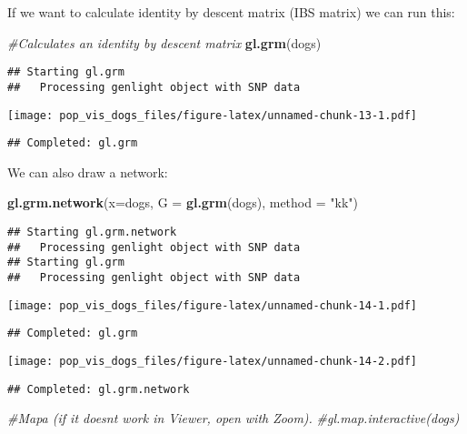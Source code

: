 \documentclass[
]{article}
\newenvironment{Shaded}{\begin{snugshade}}{\end{snugshade}}
\newcommand{\AttributeTok}[1]{\textcolor[rgb]{0.13,0.29,0.53}{#1}}
\newcommand{\CommentTok}[1]{\textcolor[rgb]{0.56,0.35,0.01}{\textit{#1}}}
\newcommand{\FunctionTok}[1]{\textcolor[rgb]{0.13,0.29,0.53}{\textbf{#1}}}
\newcommand{\NormalTok}[1]{#1}
\newcommand{\StringTok}[1]{\textcolor[rgb]{0.31,0.60,0.02}{#1}}
\begin{document}
If we want to calculate identity by descent matrix (IBS matrix) we can
run this:

\begin{Shaded}
\begin{Highlighting}[]
\CommentTok{\#Calculates an identity by descent matrix}
\FunctionTok{gl.grm}\NormalTok{(dogs)}
\end{Highlighting}
\end{Shaded}

\begin{verbatim}
## Starting gl.grm 
##   Processing genlight object with SNP data
\end{verbatim}

\texttt{[image: pop\_vis\_dogs\_files/figure-latex/unnamed-chunk-13-1.pdf]}

\begin{verbatim}
## Completed: gl.grm
\end{verbatim}

We can also draw a network:

\begin{Shaded}
\begin{Highlighting}[]
\FunctionTok{gl.grm.network}\NormalTok{(}\AttributeTok{x=}\NormalTok{dogs, }\AttributeTok{G =} \FunctionTok{gl.grm}\NormalTok{(dogs), }\AttributeTok{method =} \StringTok{"kk"}\NormalTok{)}
\end{Highlighting}
\end{Shaded}

\begin{verbatim}
## Starting gl.grm.network 
##   Processing genlight object with SNP data
## Starting gl.grm 
##   Processing genlight object with SNP data
\end{verbatim}

\texttt{[image: pop\_vis\_dogs\_files/figure-latex/unnamed-chunk-14-1.pdf]}

\begin{verbatim}
## Completed: gl.grm
\end{verbatim}

\texttt{[image: pop\_vis\_dogs\_files/figure-latex/unnamed-chunk-14-2.pdf]}

\begin{verbatim}
## Completed: gl.grm.network
\end{verbatim}

\begin{Shaded}
\begin{Highlighting}[]
\CommentTok{\#Mapa (if it doesn\textquotesingle{}t work in Viewer, open with Zoom).}
\CommentTok{\#gl.map.interactive(dogs)}
\end{Highlighting}
\end{Shaded}
\end{document}
